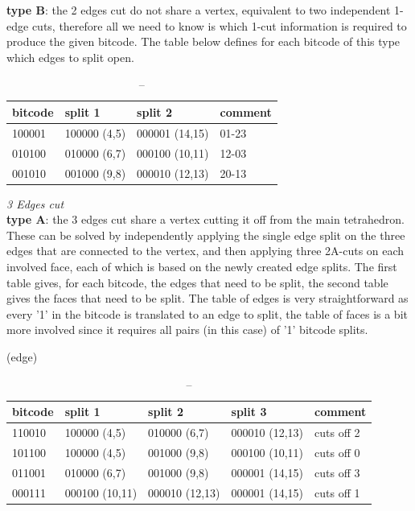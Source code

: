 \textbf{type B}: the 2 edges cut do not share a vertex, equivalent to two independent 1-edge cuts, therefore all we need to know is which 1-cut information is required to produce the given bitcode. The table below defines for each bitcode of this type which edges to split open.


\begin{table}[]
\begin{tabular}{|l|l|l|l|}
\hline
bitcode & split 1      & split 2        & comment \\ \hline
100001  & 100000 (4,5) & 000001 (14,15) & 01-23   \\ \hline
010100  & 010000 (6,7) & 000100 (10,11) & 12-03   \\ \hline
001010  & 001000 (9,8) & 000010 (12,13) & 20-13   \\ \hline
\end{tabular}
\caption{--}
\end{table}




\textit{3 Edges cut}\\
\textbf{type A}: the 3 edges cut share a vertex cutting it off from the main tetrahedron. These can be solved by independently applying the single edge split on the three edges that are connected to the vertex, and then applying three 2A-cuts on each involved face, each of which is based on the newly created edge splits. The first table gives, for each bitcode, the edges that need to be split, the second table gives the faces that need to be split. The table of edges is very straightforward as every '1' in the bitcode is translated to an edge to split, the table of faces is a bit more involved since it requires all pairs (in this case) of '1' bitcode splits.

(edge)\\
\begin{table}[]
\begin{tabular}{|l|l|l|l|l|}
\hline
bitcode & split 1        & split 2        & split 3        & comment    \\ \hline
110010  & 100000 (4,5)   & 010000 (6,7)   & 000010 (12,13) & cuts off 2 \\ \hline
101100  & 100000 (4,5)   & 001000 (9,8)   & 000100 (10,11) & cuts off 0 \\ \hline
011001  & 010000 (6,7)   & 001000 (9,8)   & 000001 (14,15) & cuts off 3 \\ \hline
000111  & 000100 (10,11) & 000010 (12,13) & 000001 (14,15) & cuts off 1 \\ \hline
\end{tabular}
\caption{--}
\end{table}


